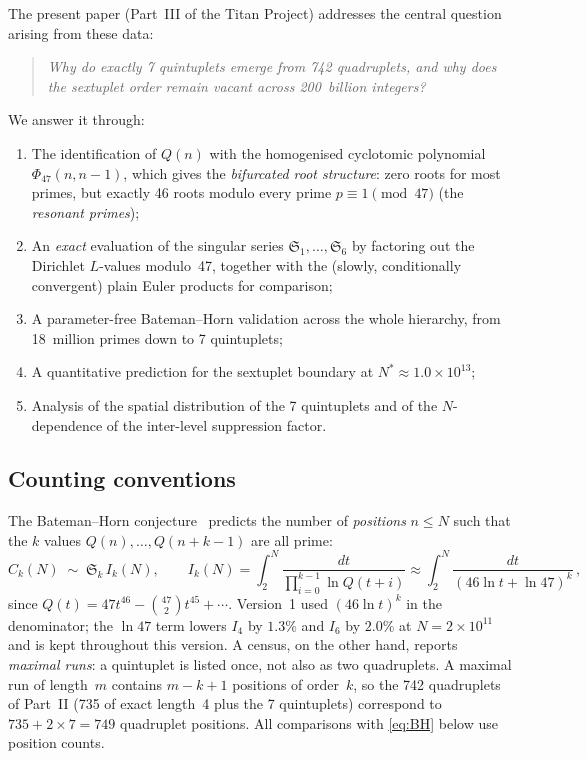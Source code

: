 ﻿\documentclass[11pt,a4paper]{article}
\newcommand{\Sk}[1]{\mathfrak{S}_{#1}}
\begin{document}
The present paper (Part~III of the Titan Project) addresses the
central question arising from these data:
\begin{quote}
\itshape Why do exactly 7 quintuplets emerge from 742 quadruplets,
and why does the sextuplet order remain vacant across 200~billion integers?
\end{quote}
We answer it through:
\begin{enumerate}[label=(\roman*)]
  \item The identification of $Q(n)$ with the homogenised cyclotomic polynomial
    $\Phi_{47}(n, n{-}1)$, which gives the \emph{bifurcated root structure}:
    zero roots for most primes, but exactly 46 roots modulo every
    prime $p \equiv 1 \pmod{47}$ (the \emph{resonant primes});
  \item An \emph{exact} evaluation of the singular series
    $\Sk{1}, \ldots, \Sk{6}$ by factoring out the Dirichlet $L$-values
    modulo~47, together with the (slowly, conditionally convergent) plain
    Euler products for comparison;
  \item A parameter-free Bateman--Horn validation across the whole
    hierarchy, from 18~million primes down to 7 quintuplets;
  \item A quantitative prediction for the sextuplet boundary at
    $N^* \approx 1.0 \times 10^{13}$;
  \item Analysis of the spatial distribution of the 7 quintuplets and of the
    $N$-dependence of the inter-level suppression factor.
\end{enumerate}

\subsection{Counting conventions}

The Bateman--Horn conjecture~\cite{BatemanHorn1962} predicts the number of
\emph{positions} $n \leq N$ such that the $k$ values
$Q(n), \ldots, Q(n{+}k{-}1)$ are all prime:
\begin{equation}\label{eq:BH}
  C_k(N) \;\sim\; \Sk{k}\, I_k(N), \qquad
  I_k(N) = \int_2^N \frac{dt}{\prod_{i=0}^{k-1} \ln Q(t{+}i)}
  \approx \int_2^N \frac{dt}{(46 \ln t + \ln 47)^k}\,,
\end{equation}
since $Q(t) = 47t^{46} - \binom{47}{2} t^{45} + \cdots$.  Version~1 used
$(46 \ln t)^k$ in the denominator; the $\ln 47$ term lowers $I_4$ by $1.3\%$
and $I_6$ by $2.0\%$ at $N = 2 \times 10^{11}$ and is kept throughout this
version.  A census, on the other hand, reports \emph{maximal runs}: a
quintuplet is listed once, not also as two quadruplets.  A maximal run of
length~$m$ contains $m{-}k{+}1$ positions of order~$k$, so the 742 quadruplets
of Part~II (735 of exact length~4 plus the 7 quintuplets) correspond to
$735 + 2 \times 7 = 749$ quadruplet positions.  All comparisons with
\eqref{eq:BH} below use position counts.
\end{document}
